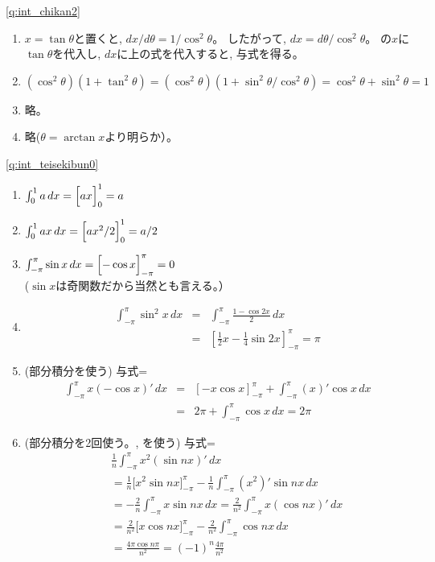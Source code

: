 \ref{q:int_chikan2} 
\begin{enumerate}
\item $x=\tan \theta$と置くと, $dx/d\theta = 1/\cos^2\theta$。
したがって, $dx = d\theta / \cos^2\theta$。
の$x$に$\tan \theta$を代入し, $dx$に上の式を代入すると, 与式を得る。
\item $(\cos^2\theta)(1+\tan^2\theta)=(\cos^2\theta)(1+\sin^2\theta/\cos^2\theta)
=\cos^2\theta+\sin^2\theta=1$
\item 略。
\item 略($\theta=\arctan x$より明らか）。
\end{enumerate}
\hv

\ref{q:int_teisekibun0} 
\begin{enumerate}
\item $\int_{0}^{1}a\,dx=\Bigl[ax\Bigr]_{0}^{1}=a$
\item $\int_{0}^{1}ax\,dx=\Bigl[ax^2/2\Bigr]_{0}^{1}=a/2$
\item $\int_{-\pi}^{\pi}\sin x\,dx=\Bigl[-\cos x\Bigr]_{-\pi}^{\pi}=0$\\
($\sin x$は奇関数だから当然とも言える。）
\item 
\begin{eqnarray*}
\int_{-\pi}^{\pi}\sin ^2 x\,dx&=&\int_{-\pi}^{\pi}\frac{1-\cos 2x}{2}\,dx\nonumber\\
&=&\left[\frac{1}{2}x-\frac{1}{4}\sin 2x\right]_{-\pi}^{\pi}=\pi\end{eqnarray*}
\item (部分積分を使う) 与式=
\begin{eqnarray*}\int_{-\pi}^{\pi} x (-\cos x)'\, dx
&=&[-x\cos x]_{-\pi}^{\pi}+\int_{-\pi}^{\pi} (x)'\cos x\, dx\\
&=&2\pi+\int_{-\pi}^{\pi} \cos x\, dx=2\pi\end{eqnarray*}
\item (部分積分を2回使う。, を使う) 与式=
\begin{eqnarray*}
&&\frac{1}{n}\int_{-\pi}^{\pi} x^2 (\sin nx)'\, dx\\
&&=\frac{1}{n}\bigl[x^2\sin nx\bigr]_{-\pi}^{\pi}-\frac{1}{n}\int_{-\pi}^{\pi} (x^2)' \sin nx\, dx\\
&&=-\frac{2}{n}\int_{-\pi}^{\pi} x \sin nx\, dx
=\frac{2}{n^2}\int_{-\pi}^{\pi} x (\cos nx)'\, dx\\
&&=\frac{2}{n^2}\bigl[x \cos nx\bigr]_{-\pi}^{\pi}-\frac{2}{n^2}\int_{-\pi}^{\pi} \cos nx\, dx\\
&&=\frac{4\pi \cos n\pi}{n^2}=(-1)^n\frac{4\pi}{n^2}
\end{eqnarray*}
\end{enumerate}
\mv

